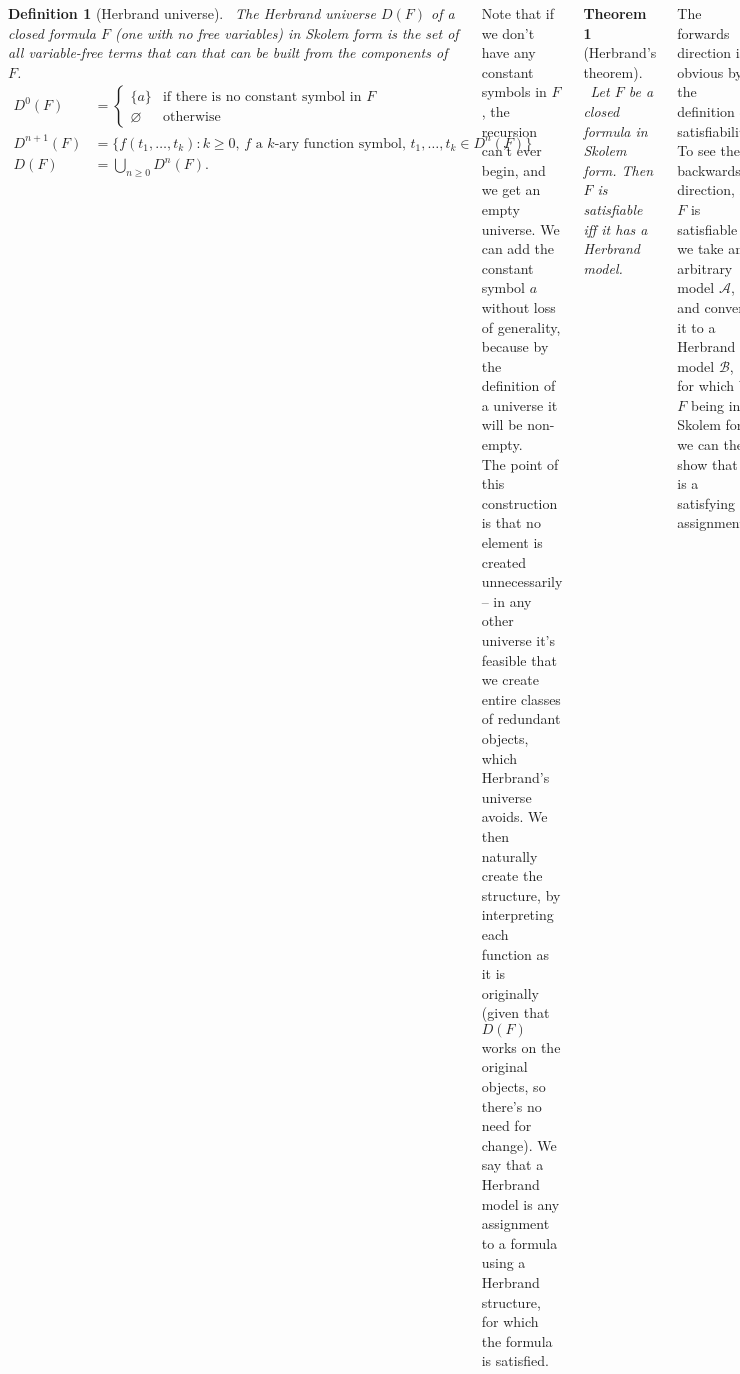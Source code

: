\documentclass{tikzposter} %
\newtheorem{theorem}{Theorem}
\newtheorem{definition}{Definition}
\begin{document}
\begin{columns}
{{      \begin{definition}[Herbrand universe]
        \ The Herbrand universe $D(F)$ of a closed formula $F$ (one with no free variables) in Skolem form is the set of all variable-free terms that can that can be built from the components of $F$.
        \begin{align*}
          D^{0}(F) &= \begin{cases}
            \{a\} & \text{if there is no constant symbol in } F \\
            \varnothing & \text{otherwise}
            \end{cases} \\
          D^{n+1}(F) &= \{ f(t_{1},\dots,t_{k}) : k \ge 0,\,f \text{ a } k\text{-ary function symbol},\,t_{1},\dots,t_{k} \in D^{n}(F) \} \\
          D(F) &= \bigcup_{n \ge 0} D^{n}(F).
        \end{align*}
      \end{definition}
      \hphantom{}

      Note that if we don't have any constant symbols in $F$, the recursion can't ever begin, and we get an empty universe. We can add the constant symbol $a$ without loss of generality, because by the definition of a universe it will be non-empty. \\

      The point of this construction is that no element is created unnecessarily -- in any other universe it's feasible that we create entire classes of redundant objects, which Herbrand's universe avoids. We then naturally create the structure, by interpreting each function as it is originally (given that $D(F)$ works on the original objects, so there's no need for change). We say that a Herbrand model is any assignment to a formula using a Herbrand structure, for which the formula is satisfied. \\

      \begin{theorem}[Herbrand's theorem]
      \ Let $F$ be a closed formula in Skolem form. Then $F$ is satisfiable iff it has a Herbrand model.
      \end{theorem}
      \hphantom{}

      The forwards direction is obvious by the definition of satisfiability. To see the backwards direction, if $F$ is satisfiable we take an arbitrary model $\mathcal{A}$, and convert it to a Herbrand model $\mathcal{B}$, for which by $F$ being in Skolem form we can then show that $\mathcal{B}$ is a satisfying assignment. \\

}}
\end{columns}
\end{document}
